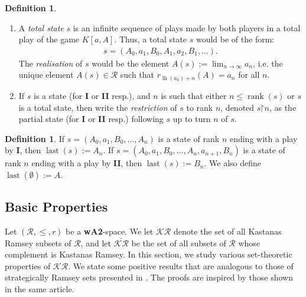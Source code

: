 \documentclass[11pt,reqno]{amsart}
\theoremstyle{plain}
\numberwithin{equation}{section}
\theoremstyle{definition}
\newtheorem{definition}[theorem]{Definition}
\newcommand{\func}{\operatorname}
\renewcommand{\bar}[1]{\overline{#1}}
\newcommand{\cal}{\mathcal}
\newcommand{\bcal}[1]{\bm{\mathcal{#1}}}
\newcommand{\rank}{\func{rank}}
\newcommand{\restrictedto}{\mathord{\upharpoonright}}
\newcommand{\lh}{\func{lh}}
\newcommand{\last}{\func{last}}
\begin{document}
\begin{definition}
\begin{enumerate}
        \item A \emph{total state} $s$ is an infinite sequence of plays made by both players in a total play of the game $K[a,A]$. Thus, a total state $s$ would be of the form:
        \begin{align*}
            s = (A_0,a_1,B_0,A_1,a_2,B_1,\dots).
        \end{align*}
        The \emph{realisation} of $s$ would be the element $A(s) := \lim_{n \to \infty} a_n$, i.e. the unique element $A(s) \in \cal{R}$ such that $r_{\lh(a_0)+n}(A) = a_n$ for all $n$.

        \item If $s$ is a state (for \textbf{I} or \textbf{II} resp.), and $n$ is such that either $n \leq \rank(s)$ or $s$ is a total state, then write the \emph{restriction} of $s$ to rank $n$, denoted $s\restrictedto n$, as the partial state (for \textbf{I} or \textbf{II} resp.) following $s$ up to turn $n$ of $s$.
    \end{enumerate}
\end{definition}

\begin{definition}
\label{def:state.last}
    If $s = (A_0,a_1,B_0,\dots,A_n)$ is a state of rank $n$ ending with a play by \textbf{I}, then $\last(s) := A_n$. If $s = (A_0,a_1,B_0,\dots,A_n,a_{n+1},B_n)$ is a state of rank $n$ ending with a play by \textbf{II}, then $\last(s) := B_n$. We also define $\last(\emptyset) := A$. 
\end{definition}

\subsection{Basic Properties}
Let $(\cal{R},\leq,r)$ be a \textbf{wA2}-space. We let $\bcal{KR}$ denote the set of all Kastanas Ramsey subsets of $\cal{R}$, and let $\bar{\bcal{KR}}$ be the set of all subsets of $\cal{R}$ whose complement is Kastanas Ramsey. In this section, we study various set-theoretic properties of $\bcal{KR}$. We state some positive results that are analogous to those of strategically Ramsey sets presented in \cite{R08}. The proofs are inspired by those shown in the same article.
\end{document}
